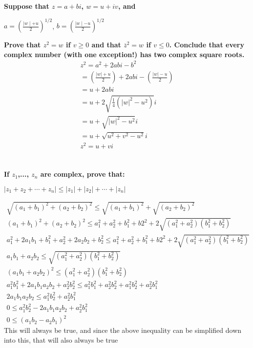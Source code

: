 \documentclass{article}
\begin{document}
\section{}
\noindent \textbf{Suppose that $z = a + bi$, $w = u + iv$, and} \begin{center} $a = (\frac{\mid w \mid + u}{2})^{1/2}$, $b = (\frac{\mid w \mid - u}{2})^{1/2}$ \end{center}
\textbf{Prove that $z^2 = w$ if $v \ge 0$ and that $\overline{z}^2 = w$ if $v \le 0$. Conclude that every complex number (with one exception!) has two complex square roots.}
\begin{align*}
z^2 = a^2 + 2abi - b^2\\
= (\frac{ |w| + u}{2}) + 2abi - (\frac{|w| - u}{2})\\
 = u + 2abi\\
 = u + 2\sqrt{\frac{1}{4}(|w|^2 - u^2)}i\\
 = u + \sqrt{|w|^2 - u^2}i\\
 = u + \sqrt{u^2 + v^2 - u^2}i\\
 z^2 = u + vi 
\end{align*}

\section{}
\noindent \textbf{If $z_1$,..., $z_n$ are complex, prove that:} \begin{center} $|z_1 + z_2 + \cdots + z_n| \le |z_1| + |z_2| + \cdots + |z_n| $\end{center} 
\begin{align*}
\sqrt{(a_1 + b_1)^2+(a_2 + b_2)^2} \le \sqrt{(a_1 + b_1)^2} + \sqrt{(a_2 + b_2)^2}\\
(a_1 + b_1)^2+(a_2 + b_2)^2 \le a_1^2 + a_2^2 + b_1^2 + b2^2 + 2\sqrt{(a_1^2 + a_2^2)(b_1^2 + b_2^2)}\\
a_1^2 + 2a_1 b_1 + b_1^2 + a_2^2 + 2a_2 b_2 + b_2^2 \le a_1^2 + a_2^2 + b_1^2 + b2^2 + 2\sqrt{(a_1^2 + a_2^2)(b_1^2 + b_2^2)}\\
a_1b_1 + a_2b_2 \le \sqrt{(a_1^2 + a_2^2)(b_1^2 + b_2^2)}\\
(a_1b_1 + a_2b_2)^2 \le (a_1^2 + a_2^2)(b_1^2 + b_2^2)\\
a_1^2b_1^2 + 2a_1b_1a_2b_2 + a_2^2b_2^2 \le a_1^2b_1^2 + a_2^2b_2^2 + a_1^2b_2^2 + a_2^2b_1^2\\
2a_1b_1a_2b_2 \le a_1^2b_2^2 + a_2^2b_1^2\\
0 \le a_1^2b_2^2 - 2a_1b_1a_2b_2 +  a_2^2b_1^2\\
0 \le (a_1b_2 - a_2b_1)^2
\end{align*}
This will always be true, and since the above inequality can be simplified down into this, that will also always be true
\end{document}

